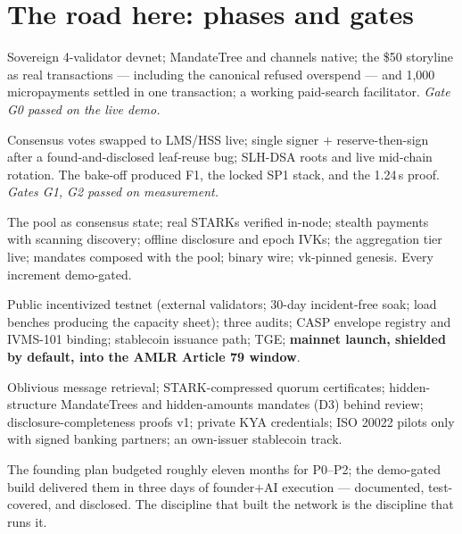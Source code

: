 \documentclass[11pt]{article}
\begin{document}
\section{The road here: phases and gates}\label{sec:history}
\begin{description}[leftmargin=1.2em,itemsep=3pt]
  \item[P0 --- the fundable demo (complete 2026-08-16).] Sovereign 4-validator devnet; MandateTree and channels native; the \$50 storyline as real transactions --- including the canonical refused overspend --- and 1{,}000 micropayments settled in one transaction; a working paid-search facilitator. \emph{Gate G0 passed on the live demo.}
  \item[P1 --- quantum-secure core (complete 2026-08-17).] Consensus votes swapped to LMS/HSS live; single signer $+$ reserve-then-sign after a found-and-disclosed leaf-reuse bug; SLH-DSA roots and live mid-chain rotation. The bake-off produced F1, the locked SP1 stack, and the 1.24\,s proof. \emph{Gates G1, G2 passed on measurement.}
  \item[P2 --- the private bank opens (complete 2026-08-17).] The pool as consensus state; real STARKs verified in-node; stealth payments with scanning discovery; offline disclosure and epoch IVKs; the aggregation tier live; mandates composed with the pool; binary wire; vk-pinned genesis. Every increment demo-gated.
  \item[P3 --- hardening to mainnet.] Public incentivized testnet (external validators; 30-day incident-free soak; load benches producing the capacity sheet); three audits; CASP envelope registry and IVMS-101 binding; stablecoin issuance path; TGE; \textbf{mainnet launch, shielded by default, into the AMLR Article 79 window}.
  \item[P4 --- scale and moats (the live roadmap).] Oblivious message retrieval; STARK-compressed quorum certificates; hidden-structure MandateTrees and hidden-amounts mandates (D3) behind review; disclosure-completeness proofs v1; private KYA credentials; ISO 20022 pilots only with signed banking partners; an own-issuer stablecoin track.
\end{description}
The founding plan budgeted roughly eleven months for P0--P2; the demo-gated build delivered them in three days of founder$+$AI execution --- documented, test-covered, and disclosed. The discipline that built the network is the discipline that runs it.
\end{document}
